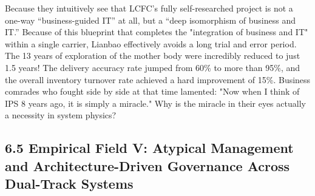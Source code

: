 \documentclass[11pt,a4paper]{article}
\begin{document}
Because they intuitively see that LCFC’s fully self-researched project is not a one-way “business-guided IT” at all, but a “deep isomorphism of business and IT.” Because of this blueprint that completes the "integration of business and IT" within a single carrier, Lianbao effectively avoids a long trial and error period. The 13 years of exploration of the mother body were incredibly reduced to just 1.5 years! The delivery accuracy rate jumped from 60\% to more than 95\%, and the overall inventory turnover rate achieved a hard improvement of 15\%. Business comrades who fought side by side at that time lamented: "Now when I think of IPS 8 years ago, it is simply a miracle." Why is the miracle in their eyes actually a necessity in system physics?


\subsection*{6.5 Empirical Field V: Atypical Management and Architecture-Driven Governance Across Dual-Track Systems}
\end{document}
